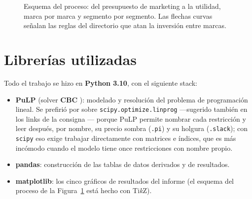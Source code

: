 \documentclass[10pt,a4paper]{article}
\begin{document}
\begin{figure}[htbp]
{}
\caption{Esquema del proceso: del presupuesto de marketing a la utilidad, marca
por marca y segmento por segmento. Las flechas curvas señalan las reglas del
directorio que atan la inversión entre marcas.}
\label{fig:proceso}
\end{figure}

\section{Librerías utilizadas}
\label{sec:librerias}

Todo el trabajo se hizo en \textbf{Python 3.10}, con el siguiente stack:

\begin{itemize}
  \item \textbf{PuLP} \cite{pulp} (solver \textbf{CBC} \cite{cbc}): modelado
  y resolución del problema de programación lineal. Se prefirió por sobre
  \texttt{scipy.optimize.linprog} —sugerido también en los links de la
  consigna \cite{consigna}— porque PuLP permite nombrar cada restricción y
  leer después, por nombre, su precio sombra (\texttt{.pi}) y su holgura
  (\texttt{.slack}); con \texttt{scipy} eso exige trabajar directamente con
  matrices e índices, que es más incómodo cuando el modelo tiene once
  restricciones con nombre propio.
  \item \textbf{pandas}: construcción de las tablas de datos derivados y de
  resultados.
  \item \textbf{matplotlib}: los cinco gráficos de resultados del informe (el
  esquema del proceso de la Figura~\ref{fig:proceso} está hecho con Ti\emph{k}Z).
\end{itemize}
\end{document}
